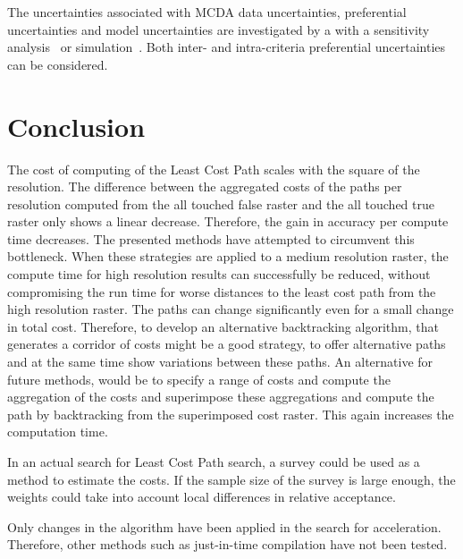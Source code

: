 \documentclass[acmtog]{acmart}
\begin{document}
	The uncertainties associated with \acrshort{MCDA} data uncertainties, preferential uncertainties and model uncertainties are investigated by a with a sensitivity analysis~\cite{bertsch_participatory_2016} or simulation~\cite{butler_simulation_1997}.
	Both inter- and intra-criteria preferential uncertainties~\cite{bertsch_sensitivity_2007} can be considered.
		
	\section{Conclusion}\label{sec:conclusion}
	The cost of computing of the Least Cost Path scales with the square of the resolution.
	The difference between the aggregated costs of the paths per resolution computed from the all touched false raster and the all touched true raster only shows a linear decrease.
	Therefore, the gain in accuracy per compute time decreases.
	The presented methods have attempted to circumvent this bottleneck.
	When these strategies are applied to a medium resolution raster, the compute time for high resolution results can successfully be reduced, without compromising the run time for worse distances to the least cost path from the high resolution raster.
	The paths can change significantly even for a small change in total cost.
	Therefore, to develop an alternative backtracking algorithm, that generates a corridor of costs might be a good strategy, to offer alternative paths and at the same time show variations between these paths.
	An alternative for future methods, would be to specify a range of costs and compute the aggregation of the costs and superimpose these aggregations and compute the path by backtracking from the superimposed cost raster. 
	This again increases the computation time.
	
	In an actual search for Least Cost Path search, a survey could be used as a method to estimate the costs.
	If the sample size of the survey is large enough, the
	weights could take  into account local differences in relative acceptance.
	
	Only changes in the algorithm have been applied in the search for acceleration.
	Therefore, other methods such as just-in-time compilation have not been tested.





\end{document}
